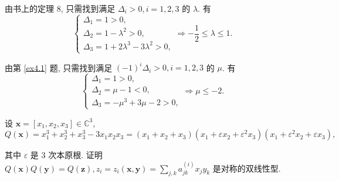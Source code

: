 \documentclass[color=black,device=normal,lang=cn,mode=geye]{elegantnote}
\begin{document}
\begin{solution}
    由书上的定理 8, 只需找到满足 $\Delta_i>0,i=1,2,3$ 的 $\lambda$. 有
    \[\begin{cases}
        \Delta_1=1>0, \\
        \Delta_2=1-\lambda^2>0, \\
        \Delta_3=1+2\lambda^3-3\lambda^2>0,
    \end{cases}\Rightarrow-\dfrac{1}{2}\leq\lambda\leq1.\]

    由第 \ref{ex4.1} 题, 只需找到满足 $(-1)^i\Delta_i>0,i=1,2,3$ 的 $\mu$. 有
    \[\begin{cases}
        \Delta_1=1>0, \\
        \Delta_2=\mu-1<0, \\
        \Delta_3=-\mu^3+3\mu-2>0,
    \end{cases}\Rightarrow\mu\leq-2.\]
\end{solution}
\begin{exercise}%
    设 $\boldsymbol{x}=[x_1,x_2,x_3]\in\mathbb{C}^3$,
    \[Q(\boldsymbol{x})=x_1^3+x_2^3+x_3^3-3x_1x_2x_3=(x_1+x_2+x_3)(x_1+\varepsilon x_2+\varepsilon^2x_3)(x_1+\varepsilon^2x_2+\varepsilon x_3),\]

    其中 $\varepsilon$ 是 $3$ 次本原根. 证明 $Q(\boldsymbol{x})Q(\boldsymbol{y})=Q(\boldsymbol{z}),z_i=z_i(\boldsymbol{x},\boldsymbol{y})=\sum_{j,k}a^{(i)}_{jk}x_jy_k$ 是对称的双线性型.
\end{exercise}
\end{document}
